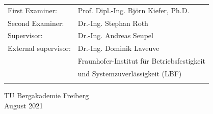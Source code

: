 \begin{titlepage}
\begin{center}
\begin{tabular}{l l}
	\vspace{0.2cm}
    \hspace*{1cm} \large{First Examiner:} & \hspace*{1cm}\large{Prof. Dipl.-Ing. Björn Kiefer, Ph.D.}\\
    \vspace{0.2cm}
    \hspace*{1cm} \large{Second Examiner:} & \hspace*{1cm}\large{Dr.-Ing. Stephan Roth}\\
	\vspace{0.2cm}
    \hspace*{1cm} \large{Supervisor:} & \hspace*{1cm}\large{Dr.-Ing. Andreas Seupel} \\

    \hspace*{1cm} \large {External supervisor:} & \hspace*{1cm}\large{Dr.-Ing. Dominik Laveuve }\\
    \hspace*{1cm}  & \hspace*{1cm}\large{Fraunhofer-Institut für Betriebsfestigkeit}\\ 
    \hspace*{1cm}  & \hspace*{1cm}\large{und Systemzuverlässigkeit (LBF) }\\\\  
   \end{tabular}
   
   \vspace*{0.7cm}
    \large { TU Bergakademie Freiberg } \\
     \vspace*{0.3cm}
    \large { August 2021 }
   
   
   
	\end{center}
\end{titlepage}